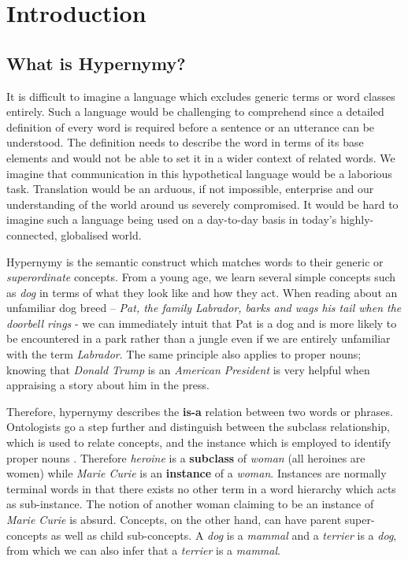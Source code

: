\chapter{Introduction}


\section{What is Hypernymy?} %
It is difficult to imagine a language which excludes generic terms or word classes entirely.  Such a language would be challenging to comprehend since a detailed definition of every word is required before a sentence or an utterance can be understood.  The definition needs to describe the word in terms of its base elements and would not be able to set it in a wider context of related words.  We imagine that communication in this hypothetical language would be a laborious task.  Translation would be an arduous, if not impossible, enterprise and our understanding of the world around us severely compromised.  It would be hard to imagine such a language being used on a day-to-day basis in today's highly-connected, globalised world.

Hypernymy is the semantic construct which matches words to their generic or \textit{superordinate} concepts.  From a young age, we learn several simple concepts such as \textit{dog} in terms of what they look like and how they act.  When reading about an unfamiliar dog breed – \textit{Pat, the family Labrador, barks and wags his tail when the doorbell rings} - we can immediately intuit that Pat is a dog and is more likely to be encountered in a park rather than a jungle even if we are entirely unfamiliar with the term \textit{Labrador}.  The same principle also applies to proper nouns; knowing that \textit{Donald Trump} is an \textit{American President} is very helpful when appraising a story about him in the press.  

Therefore, hypernymy describes the \textbf{is-a} relation between two words or phrases.  Ontologists go a step further and distinguish between the subclass relationship, which is used to relate concepts, and the instance which is employed to identify proper nouns \citep{miller1990introduction}.  Therefore \textit{heroine} is a \textbf{subclass} of \textit{woman} (all heroines are women) while \textit{Marie Curie} is an \textbf{instance} of a \textit{woman}.  Instances are normally terminal words in that there exists no other term in a word hierarchy which acts as sub-instance.  The notion of another woman claiming to be an instance of \textit{Marie Curie} is absurd.  Concepts, on the other hand, can have parent super-concepts as well as child sub-concepts.  A \textit{dog} is a \textit{mammal} and a \textit{terrier} is a \textit{dog}, from which we can also infer that a \textit{terrier} is a \textit{mammal}.

